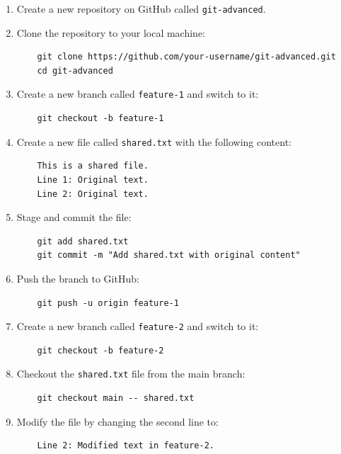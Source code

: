 \documentclass[a4paper,12pt]{article}
\begin{document}
\begin{enumerate}
    \item Create a new repository on GitHub called \texttt{git-advanced}.
    \item Clone the repository to your local machine:
    \begin{verbatim}
    git clone https://github.com/your-username/git-advanced.git
    cd git-advanced
    \end{verbatim}
    
    \item Create a new branch called \texttt{feature-1} and switch to it:
    \begin{verbatim}
    git checkout -b feature-1
    \end{verbatim}
    
    \item Create a new file called \texttt{shared.txt} with the following content:
    \begin{verbatim}
    This is a shared file.
    Line 1: Original text.
    Line 2: Original text.
    \end{verbatim}
    
    \item Stage and commit the file:
    \begin{verbatim}
    git add shared.txt
    git commit -m "Add shared.txt with original content"
    \end{verbatim}
    
    \item Push the branch to GitHub:
    \begin{verbatim}
    git push -u origin feature-1
    \end{verbatim}
    
    \item Create a new branch called \texttt{feature-2} and switch to it:
    \begin{verbatim}
    git checkout -b feature-2
    \end{verbatim}
    
    \item Checkout the \texttt{shared.txt} file from the main branch:
    \begin{verbatim}
    git checkout main -- shared.txt
    \end{verbatim}
    
    \item Modify the file by changing the second line to:
    \begin{verbatim}
    Line 2: Modified text in feature-2.
    \end{verbatim}
    

\end{enumerate}
\end{document}
